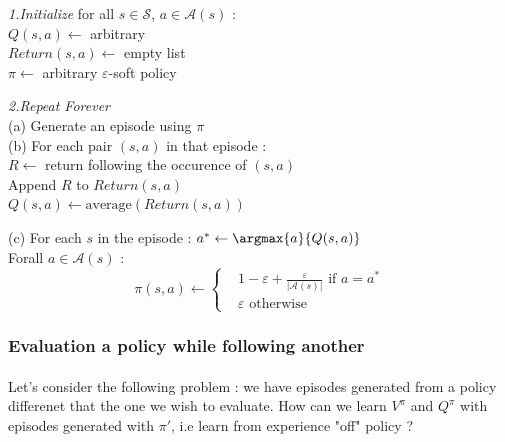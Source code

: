 \documentclass[a4paper]{article}
\begin{document}
{{{{					\vspace{10pt}
					
					{
					\begin{algorithm}[H]
	 					\SetAlgoLined
						\LinesNumbered
						 \textsf{\emph{1.Initialize }} for all $s\in\mathcal{S}$, $a\in\mathcal{A}(s)$ : \\
						 	\Indp \Indp
								$ Q(s,a) \leftarrow $ arbitrary \\
								$Return(s,a) \leftarrow$ empty list \\
								$\pi \leftarrow$ arbitrary $\varepsilon$-soft policy
								
							\Indm \Indm 
					 		\BlankLine
							\BlankLine
							\textsf{\emph{2.Repeat Forever }} \\
							\Indp \Indp 
								(a) Generate an episode using $\pi$ \\
								(b) For each pair $(s,a)$ in that episode :\\
								\Indp \Indp 
									$R \leftarrow$ return following the occurence of $(s,a)$ \\
									Append $R$ to $Return(s,a)$\\
									$Q(s,a) \leftarrow \text{average}(Return(s,a))$
									
								\Indm \Indm
								
								(c) For each $s$ in the episode : 
								\Indp \Indp 
									$a^* \leftarrow \argmax{a}{Q(s,a)}$ \\
									Forall $a\in\mathcal{A}(s)$ : 
									$$
										\pi(s,a) \leftarrow \left\{ \begin{aligned} 
															&1 - \varepsilon + \frac{\varepsilon}{\vert \mathcal{A}(s) \vert } \text{ if } a=a^*\\
															&\varepsilon \text{ otherwise} 
														\end{aligned}\right. $$
								
								\Indm \Indm 
							
							\Indm \Indm
					\end{algorithm}
					}
					
					\subsubsection{Evaluation a policy while following another}
					{
						\paragraph{} Let's consider the following problem : we have episodes generated from a policy differenet that the one we wish to evaluate. How can we learn $V^\pi$ and $Q^\pi$ with episodes generated with $\pi'$, i.e learn from experience "off" policy ? 
						
}}}}}
\end{document}
